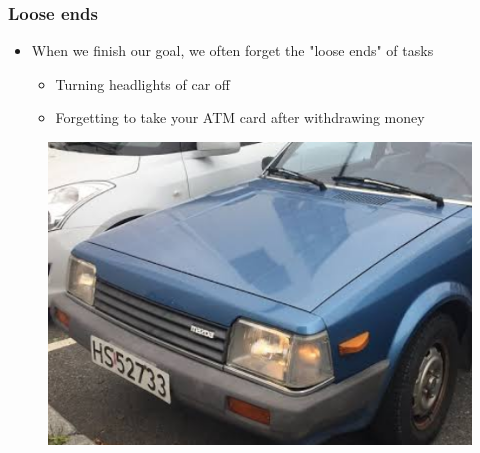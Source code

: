 \documentclass{beamer}
\begin{document}
%
%
%
%

\begin{frame}
\frametitle{Loose ends}
\begin{itemize}
\item When we finish our goal, we often forget the "loose ends" of tasks
\begin{itemize}
\item Turning headlights of car off
\item Forgetting to take your ATM card after withdrawing money
\end{itemize}
\end{itemize}
	\begin{figure}
	\includegraphics[width=0.6\linewidth]{image/carlight}
\end{figure}
\end{frame}
\end{document}
